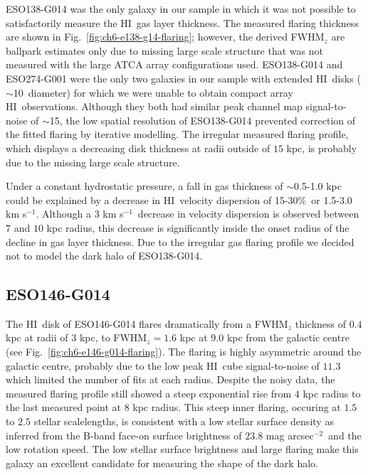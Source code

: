 \documentclass[traditabstract]{aa} %
\newcommand\HI{H{\small I}}
\newcommand\kms{km s$^{-1}$}
\newcommand\magarcsecsq{mag arcsec$^{-2}$}
\begin{document}
ESO138-G014 was the only galaxy in our sample in which it was not 
possible to satisfactorily measure the \HI\ gas layer thickness. The measured
flaring thickness are shown in Fig.~\ref{fig:ch6-e138-g14-flaring}; 
however, the derived FWHM$_z$ are ballpark estimates only due to
missing large scale structure that was not measured with the large ATCA array
configurations used. ESO138-G014 and ESO274-G001
were the only two galaxies in our sample with extended \HI\ disks
($\sim$10\arcmin\ diameter) for which we were unable to obtain compact
array \HI\ observations. Although they both had similar peak
channel map signal-to-noise of $\sim$15, the low spatial resolution of
ESO138-G014 prevented correction of the fitted flaring
by iterative modelling. The irregular measured flaring profile, which displays
a decreasing disk thickness at radii outside of $15$ kpc, is probably due to 
the missing large scale structure.

Under a constant hydrostatic pressure, a fall in gas thickness of
$\sim$0.5-1.0 kpc could be explained by a decrease in \HI\ velocity
dispersion of 15-30\%\ or 1.5-3.0 \kms. Although a $3$ \kms\
decrease in velocity dispersion is observed between $7$ and $10$ kpc
radius, this decrease is significantly inside the onset radius of the
decline in gas layer thickness. Due to the irregular gas flaring
profile we decided not to model the dark halo of ESO138-G014.




\subsection{ESO146-G014}


The \HI\ disk of ESO146-G014 flares dramatically from a FWHM$_z$
thickness of $0.4$ kpc at radii of $3$ kpc, to FWHM$_z=1.6$ kpc at
$9.0$ kpc from the galactic centre (see
Fig.~\ref{fig:ch6-e146-g014-flaring}). The flaring is highly
asymmetric around the galactic centre, probably due to the low peak
\HI\ cube signal-to-noise of $11.3$ which
limited the number of fits at each radius.  Despite the noisy
data, the measured flaring profile still showed a steep exponential
rise from $4$ kpc radius to the last measured point at $8$ kpc radius.
This steep inner flaring, occuring at $1.5$ to $2.5$ stellar
scalelengths, is consistent with a low stellar surface density as
inferred from the B-band face-on surface brightness of $23.8$
\magarcsecsq\ and the low rotation speed. The low stellar surface
brightness and large flaring make this galaxy an excellent candidate
for measuring the shape of the dark halo.
\end{document}
